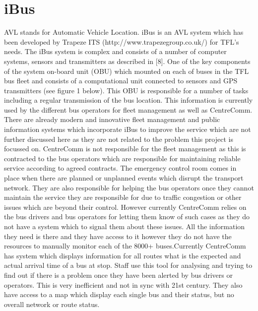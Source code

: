 \section{iBus}
	AVL stands for Automatic Vehicle Location. iBus is an AVL system which
has been developed by Trapeze ITS (http://www.trapezegroup.co.uk/) for
TFL’s needs. The iBus system is complex and consists of a number of computer
systems, sensors and transmitters as described in [8]. One of the key
components of the system on-board unit (OBU) which mounted on each of
buses in the TFL bus fleet and consists of a computational unit connected to
sensors and GPS transmitters (see figure 1 below). This OBU is responsible
for a number of tasks including a regular transmission of the bus location.
This information is currently used by the different bus operators for fleet management
as well as CentreComm. There are already modern and innovative
fleet management and public information systems which incorporate iBus to
improve the service which are not further discussed here as they are not related
to the problem this project is focussed on.
CentreComm is not responsible for the fleet management as this is contracted
to the bus operators which are responsible for maintaining reliable
service according to agreed contracts. The emergency control room comes in
place when there are planned or unplanned events which disrupt the transport
network. They are also responsible for helping the bus operators once they cannot
maintain the service they are responsible for due to traffic congestion or
other issues which are beyond their control. However currently CentreComm
relies on the bus drivers and bus operators for letting them know of such cases
as they do not have a system which to signal them about these issues. All the
information they need is there and they have access to it however they do not
have the resources to manually monitor each of the 8000+ buses.Currently CentreComm has system which displays information for all routes
what is the expected and actual arrival time of a bus at stop. Staff use this
tool for analysing and trying to find out if there is a problem once they have
been alerted by bus drivers or operators. This is very inefficient and not in
sync with 21st century. They also have access to a map which display each
single bus and their status, but no overall network or route status.

